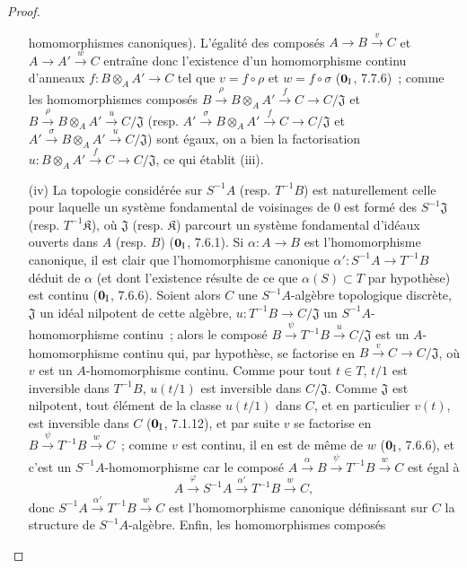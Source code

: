 \begin{proof}
\begin{enumerate}
  homomorphismes canoniques). L'égalité des composés $A\to B\xrightarrow{v}C$ et
  $A\to A'\xrightarrow{w}C$ entraîne donc l'existence d'un homomorphisme
  continu d'anneaux $f:B\otimes_A A'\to C$ tel que
  $v=f\circ\rho$ et $w=f\circ\sigma$ ($\mathbf 0_{\rm I}$, 7.7.6)~;
  comme les homomorphismes composés
  $B\xrightarrow{\rho}B\otimes_A A'\xrightarrow{f}C\to C/\mathfrak J$
  et
  $B\xrightarrow{\rho}B\otimes_A A'\xrightarrow{u}C/\mathfrak J$
  (resp.
  $A'\xrightarrow{\sigma}B\otimes_A A'\xrightarrow{f}C\to C/\mathfrak J$
  et
  $A'\xrightarrow{\sigma}B\otimes_A A'\xrightarrow{u}C/\mathfrak J$)
  sont égaux, on a bien la factorisation
  $u:B\otimes_A A'\xrightarrow{f}C\to C/\mathfrak J$, ce qui établit
  (iii).
  \item[(iv)] La topologie considérée sur $S^{-1}A$ (resp. $T^{-1}B$) est
  naturellement celle pour laquelle un système fondamental de voisinages de
  $0$ est formé des $S^{-1}\mathfrak J$ (resp. $T^{-1}\mathfrak K$), où
  $\mathfrak J$ (resp. $\mathfrak K$) parcourt un système fondamental
  d'idéaux ouverts dans $A$ (resp. $B$) ($\mathbf 0_{\rm I}$, 7.6.1). Si
  $\alpha:A\to B$ est l'homomorphisme canonique, il est clair que
  l'homomorphisme canonique $\alpha':S^{-1}A\to T^{-1}B$ déduit de
  $\alpha$ (et dont l'existence résulte de ce que $\alpha(S)\subset T$ par
  hypothèse) est continu ($\mathbf 0_{\rm I}$, 7.6.6). Soient alors $C$ une $S^{-1}A$-algèbre topologique
  discrète, $\mathfrak J$ un idéal nilpotent de cette algèbre,
  $u:T^{-1}B\to C/\mathfrak J$ un $S^{-1}A$-homomorphisme continu~; alors
  le composé $B\xrightarrow{\psi}T^{-1}B\xrightarrow{u}C/\mathfrak J$ est un
  $A$-homomorphisme continu qui, par hypothèse, se factorise en
  $B\xrightarrow{v}C\to C/\mathfrak J$, où $v$ est un $A$-homomorphisme
  continu. Comme pour tout $t\in T$, $t/1$ est inversible dans $T^{-1}B$,
  $u(t/1)$ est inversible dans $C/\mathfrak J$. Comme $\mathfrak J$ est
  nilpotent, tout élément de la classe $u(t/1)$ dans $C$, et en particulier
  $v(t)$, est inversible dans $C$ ($\mathbf 0_{\rm I}$, 7.1.12), et par suite
  $v$ se factorise en $B\xrightarrow{\psi}T^{-1}B\xrightarrow{w}C$~; comme $v$ est
  continu, il en est de même de $w$ ($\mathbf 0_{\rm I}$, 7.6.6), et c'est
  un $S^{-1}A$-homomorphisme car le composé
  $A\xrightarrow{\alpha}B\xrightarrow{\psi}T^{-1}B\xrightarrow{w}C$ est égal à
  \[
    A\xrightarrow{\varphi}S^{-1}A\xrightarrow{\alpha'}T^{-1}B\xrightarrow{w}C,
  \]
  donc $S^{-1}A\xrightarrow{\alpha'}T^{-1}B\xrightarrow{w}C$ est
  l'homomorphisme canonique définissant sur $C$ la structure de
  $S^{-1}A$-algèbre. Enfin, les homomorphismes composés

\end{enumerate}
\end{proof}
